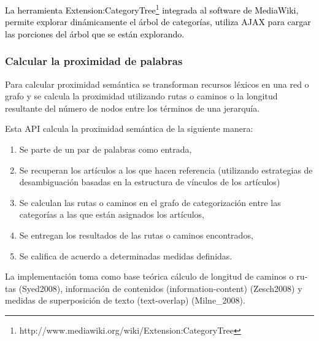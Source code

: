 \documentclass[letterpaper]{article}
\newcommand\textstylebibuscitbase[1]{#1}
\newcommand\liststyleWWviiiNumxviii{%
\renewcommand\theenumi{\arabic{enumi}}
\renewcommand\theenumii{\arabic{enumii}}
\renewcommand\theenumiii{\arabic{enumiii}}
\renewcommand\theenumiv{\arabic{enumiv}}
\renewcommand\labelenumi{\theenumi.}
\renewcommand\labelenumii{\theenumii.}
\renewcommand\labelenumiii{\theenumiii.}
\renewcommand\labelenumiv{\theenumiv.}
}
\begin{document}
\bigskip

{\sffamily
\textstylebibuscitbase{\textcolor{black}{La herramienta
Extension:CategoryTree}}\footnote{http://www.mediawiki.org/wiki/Extension:CategoryTree}\textstylebibuscitbase{\textcolor{black}{
integrada al software de MediaWiki,
}}\textstylebibuscitbase{\textcolor{black}{permite explorar
din\'amicamente el \'arbol de categor\'ias, utiliza AJAX para cargar
las porciones del \'arbol que se est\'an explorando.}}}


\bigskip

\subsubsection[Calcular la proximidad de palabras]{Calcular la
proximidad de palabras}
\hypertarget{RefHeading10802782078703}{}
\bigskip

{\sffamily
Para calcular proximidad sem\'antica se transforman recursos l\'exicos
en una red o grafo y se calcula la proximidad utilizando rutas o
caminos o la longitud resultante del n\'umero de nodos entre los
t\'erminos de una jerarqu\'ia.}


\bigskip

{\sffamily
Esta API calcula la proximidad sem\'antica de la siguiente manera:}


\bigskip

\liststyleWWviiiNumxviii
\begin{enumerate}
\item {\sffamily
Se parte de un par de palabras como entrada,}
\item {\sffamily
Se recuperan los art\'iculos a los que hacen referencia (utilizando
estrategias de desambiguaci\'on basadas en la estructura de v\'inculos
de los art\'iculos)}
\item {\sffamily
Se calculan las rutas o caminos en el grafo de categorizaci\'on entre
las categor\'ias a las que est\'an asignados los art\'iculos,}
\item {\sffamily
Se entregan los resultados de las rutas o caminos encontrados,}
\item {\sffamily
Se califica de acuerdo a determinadas medidas definidas.}
\end{enumerate}

\bigskip

{\sffamily
\foreignlanguage{spanish}{La implementaci\'on toma como base te\'orica
c\'alculo de longitud de caminos o rutas
}\textstylebibuscitbase{\foreignlanguage{spanish}{(Syed2008)}}\foreignlanguage{spanish}{,
informaci\'on de contenidos (information-content)
}\textstylebibuscitbase{\foreignlanguage{spanish}{(Zesch2008)}}\textstylebibuscitbase{\foreignlanguage{spanish}{
}}\foreignlanguage{spanish}{y medidas de superposici\'on de texto
(text-overlap)
}\textstylebibuscitbase{\foreignlanguage{spanish}{(Milne\_2008)}}\foreignlanguage{spanish}{.}}
\end{document}
